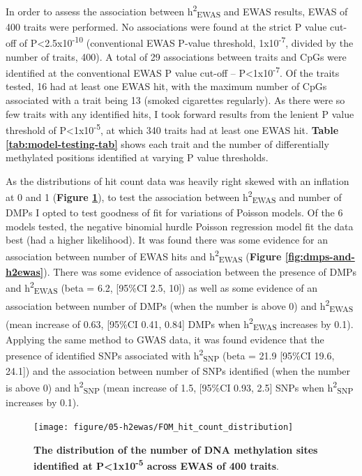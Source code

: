 \documentclass[11pt,twoside]{bristolthesis}
\begin{document}
In order to assess the association between h\textsuperscript{2}\textsubscript{EWAS} and EWAS results, EWAS of 400 traits were performed. No associations were found at the strict P value cut-off of P\textless2.5x10\textsuperscript{-10} (conventional EWAS P-value threshold, 1x10\textsuperscript{-7}, divided by the number of traits, 400). A total of 29 associations between traits and CpGs were identified at the conventional EWAS P value cut-off -- P\textless1x10\textsuperscript{-7}. Of the traits tested, 16 had at least one EWAS hit, with the maximum number of CpGs associated with a trait being 13 (smoked cigarettes regularly). As there were so few traits with any identified hits, I took forward results from the lenient P value threshold of P\textless1x10\textsuperscript{-5}, at which 340 traits had at least one EWAS hit. \textbf{Table \ref{tab:model-testing-tab}} shows each trait and the number of differentially methylated positions identified at varying P value thresholds.

As the distributions of hit count data was heavily right skewed with an inflation at 0 and 1 (\textbf{Figure \ref{fig:h2ewas-dmp-dist}}), to test the association between h\textsuperscript{2}\textsubscript{EWAS} and number of DMPs I opted to test goodness of fit for variations of Poisson models. Of the 6 models tested, the negative binomial hurdle Poisson regression model fit the data best (had a higher likelihood). It was found there was some evidence for an association between number of EWAS hits and h\textsuperscript{2}\textsubscript{EWAS} (\textbf{Figure \ref{fig:dmps-and-h2ewas}}). There was some evidence of association between the presence of DMPs and h\textsuperscript{2}\textsubscript{EWAS} (beta = 6.2, {[}95\%CI 2.5, 10{]}) as well as some evidence of an association between number of DMPs (when the number is above 0) and h\textsuperscript{2}\textsubscript{EWAS} (mean increase of 0.63, {[}95\%CI 0.41, 0.84{]} DMPs when h\textsuperscript{2}\textsubscript{EWAS} increases by 0.1). Applying the same method to GWAS data, it was found evidence that the presence of identified SNPs associated with h\textsuperscript{2}\textsubscript{SNP} (beta = 21.9 {[}95\%CI 19.6, 24.1{]}) and the association between number of SNPs identified (when the number is above 0) and h\textsuperscript{2}\textsubscript{SNP} (mean increase of 1.5, {[}95\%CI 0.93, 2.5{]} SNPs when h\textsuperscript{2}\textsubscript{SNP} increases by 0.1).




\begin{figure}

{\centering \texttt{[image: figure/05-h2ewas/FOM\_hit\_count\_distribution]} 

}

\caption[The distribution of the number of DNA methylation sites identified at P\textless1x10\textsuperscript{-5} across EWAS of 400 traits]{\textbf{The distribution of the number of DNA methylation sites identified at P\textless1x10\textsuperscript{-5} across EWAS of 400 traits}.}\label{fig:h2ewas-dmp-dist}
\end{figure}
\end{document}
